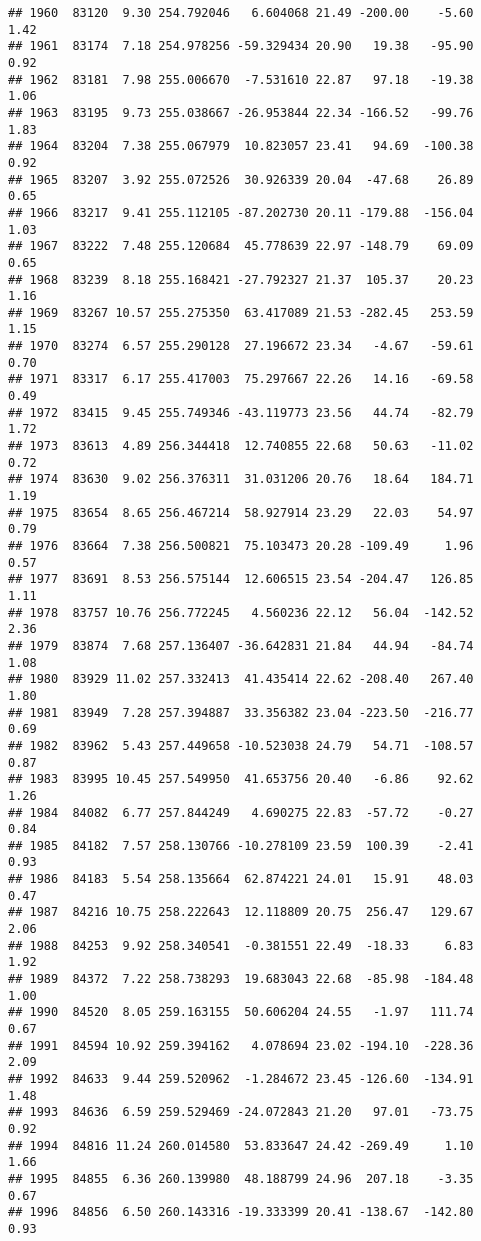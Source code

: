 \documentclass[]{article}
\begin{document}
\begin{verbatim}
## 1960  83120  9.30 254.792046   6.604068 21.49 -200.00    -5.60  1.42
## 1961  83174  7.18 254.978256 -59.329434 20.90   19.38   -95.90  0.92
## 1962  83181  7.98 255.006670  -7.531610 22.87   97.18   -19.38  1.06
## 1963  83195  9.73 255.038667 -26.953844 22.34 -166.52   -99.76  1.83
## 1964  83204  7.38 255.067979  10.823057 23.41   94.69  -100.38  0.92
## 1965  83207  3.92 255.072526  30.926339 20.04  -47.68    26.89  0.65
## 1966  83217  9.41 255.112105 -87.202730 20.11 -179.88  -156.04  1.03
## 1967  83222  7.48 255.120684  45.778639 22.97 -148.79    69.09  0.65
## 1968  83239  8.18 255.168421 -27.792327 21.37  105.37    20.23  1.16
## 1969  83267 10.57 255.275350  63.417089 21.53 -282.45   253.59  1.15
## 1970  83274  6.57 255.290128  27.196672 23.34   -4.67   -59.61  0.70
## 1971  83317  6.17 255.417003  75.297667 22.26   14.16   -69.58  0.49
## 1972  83415  9.45 255.749346 -43.119773 23.56   44.74   -82.79  1.72
## 1973  83613  4.89 256.344418  12.740855 22.68   50.63   -11.02  0.72
## 1974  83630  9.02 256.376311  31.031206 20.76   18.64   184.71  1.19
## 1975  83654  8.65 256.467214  58.927914 23.29   22.03    54.97  0.79
## 1976  83664  7.38 256.500821  75.103473 20.28 -109.49     1.96  0.57
## 1977  83691  8.53 256.575144  12.606515 23.54 -204.47   126.85  1.11
## 1978  83757 10.76 256.772245   4.560236 22.12   56.04  -142.52  2.36
## 1979  83874  7.68 257.136407 -36.642831 21.84   44.94   -84.74  1.08
## 1980  83929 11.02 257.332413  41.435414 22.62 -208.40   267.40  1.80
## 1981  83949  7.28 257.394887  33.356382 23.04 -223.50  -216.77  0.69
## 1982  83962  5.43 257.449658 -10.523038 24.79   54.71  -108.57  0.87
## 1983  83995 10.45 257.549950  41.653756 20.40   -6.86    92.62  1.26
## 1984  84082  6.77 257.844249   4.690275 22.83  -57.72    -0.27  0.84
## 1985  84182  7.57 258.130766 -10.278109 23.59  100.39    -2.41  0.93
## 1986  84183  5.54 258.135664  62.874221 24.01   15.91    48.03  0.47
## 1987  84216 10.75 258.222643  12.118809 20.75  256.47   129.67  2.06
## 1988  84253  9.92 258.340541  -0.381551 22.49  -18.33     6.83  1.92
## 1989  84372  7.22 258.738293  19.683043 22.68  -85.98  -184.48  1.00
## 1990  84520  8.05 259.163155  50.606204 24.55   -1.97   111.74  0.67
## 1991  84594 10.92 259.394162   4.078694 23.02 -194.10  -228.36  2.09
## 1992  84633  9.44 259.520962  -1.284672 23.45 -126.60  -134.91  1.48
## 1993  84636  6.59 259.529469 -24.072843 21.20   97.01   -73.75  0.92
## 1994  84816 11.24 260.014580  53.833647 24.42 -269.49     1.10  1.66
## 1995  84855  6.36 260.139980  48.188799 24.96  207.18    -3.35  0.67
## 1996  84856  6.50 260.143316 -19.333399 20.41 -138.67  -142.80  0.93

\end{verbatim}
\end{document}
